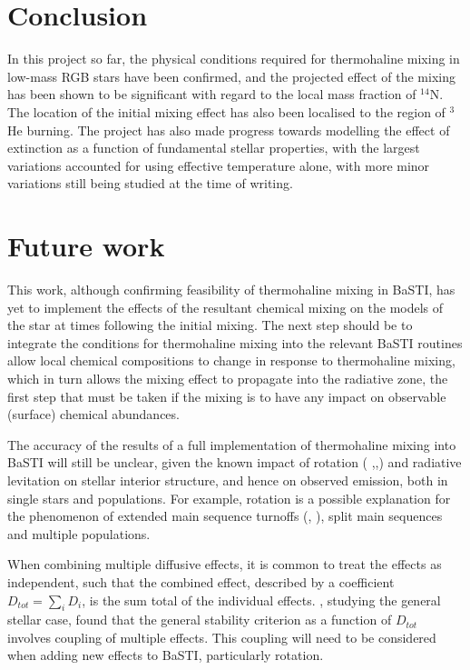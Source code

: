 \documentclass[12pt, a4paper]{report}
\begin{document}
\chapter{Conclusion}
In this project so far, the physical conditions required for thermohaline mixing in low-mass RGB stars have been confirmed, and the projected effect of the mixing has been shown to be significant with regard to the local mass fraction of $^{14}$N. The location of the initial mixing effect has also been localised to the region of $^{3}$He burning.
The project has also made progress towards modelling the effect of extinction as a function of fundamental stellar properties, with the largest variations accounted for using effective temperature alone, with more minor variations still being studied at the time of writing.


\chapter{Future work}
This work, although confirming feasibility of thermohaline mixing in BaSTI, has yet to implement the effects of the resultant chemical mixing on the models of the star at times following the initial mixing. The next step should be to integrate the conditions for thermohaline mixing into the relevant BaSTI routines allow local chemical compositions to change in response to thermohaline mixing, which in turn allows the mixing effect to propagate into the radiative zone, the first step that must be taken if the mixing is to have any impact on observable (surface) chemical abundances.

The accuracy of the results of a full implementation of thermohaline mixing into BaSTI will still be unclear, given the known impact of rotation (\cite{1963ApJ...138.1134C} \cite{1998A&A...334.1000M},\cite{2017A&A...606A..55M},\cite{2012A&A...537A.146E}) and radiative levitation \citep{2016A&A...592A..29M} on stellar interior structure, and hence on observed emission, both in single stars  and populations. For example, rotation is a possible explanation for the phenomenon of extended main sequence turnoffs (\cite{2015MNRAS.453.2070N}, \cite{2016MNRAS.460L..20B}), split main sequences and multiple populations.

When combining multiple diffusive effects, it is common to treat the effects as independent, such that the combined effect, described by a coefficient $D_{tot} = \sum_{i} D_{i}$, is the sum total of the individual effects. \cite{2013A&A...553A...1M}, studying the general stellar case, found that the general stability criterion as a function of $D_{tot}$ involves coupling of multiple effects. This coupling will need to be considered when adding new effects to BaSTI, particularly rotation.
\end{document}
